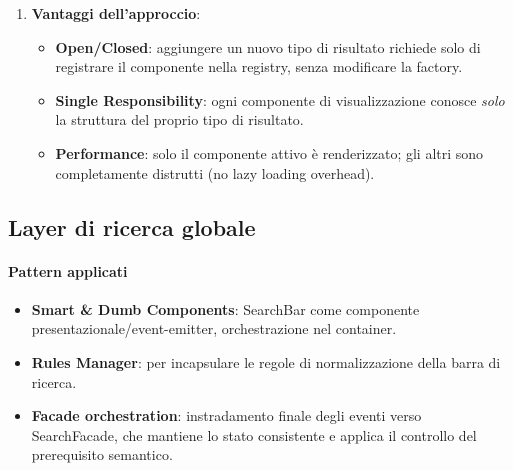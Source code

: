 \begin{enumerate}
\begin{description}
        \item[] Visualizza dati di aggregazione:
        \begin{itemize}
            \item Icona dell'aggregazione.
            \item Tipo aggregazione (fascicolo/procedimento).
            \item UUID dell'aggregazione (copiabile).
            \item Badge di integrità.
        \end{itemize}
        
        \item[] Visualizza metadati di classe documentale:
        \begin{itemize}
            \item Icona della classe.
            \item Nome classe.
            \item UUID della classe (copiabile).
            \item Badge di integrità.
        \end{itemize}
    \end{description}
    
    \item \textbf{Vantaggi dell'approccio}:
    \begin{itemize}
        \item \textbf{Open/Closed}: aggiungere un nuovo tipo di risultato richiede solo di registrare il componente nella registry, senza modificare la factory.
        \item \textbf{Single Responsibility}: ogni componente di visualizzazione conosce \textit{solo} la struttura del proprio tipo di risultato.
        \item \textbf{Performance}: solo il componente attivo è renderizzato; gli altri sono completamente distrutti (no lazy loading overhead).
    \end{itemize}
\end{enumerate}


\subsection{Layer di ricerca globale}

\paragraph{Pattern applicati}
\begin{itemize}
    \item \textbf{Smart \& Dumb Components}: SearchBar come componente presentazionale/event-emitter, orchestrazione nel container.
    \item \textbf{Rules Manager}:  per incapsulare le regole di normalizzazione della barra di ricerca.
    \item \textbf{Facade orchestration}: instradamento finale degli eventi verso SearchFacade, che mantiene lo stato consistente e applica il controllo del prerequisito semantico.
\end{itemize}

